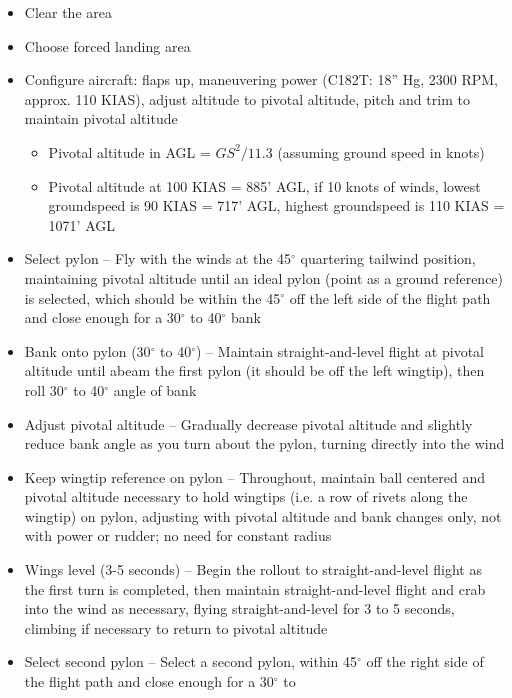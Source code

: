 \begin{itemize}
  \item Clear the area
  \item Choose forced landing area
  \item Configure aircraft: flaps up, maneuvering power (C182T: 18'' Hg, 2300
    RPM, approx. 110 KIAS), adjust altitude to pivotal altitude, pitch and trim
    to maintain pivotal altitude
    \begin{itemize}
      \item Pivotal altitude in AGL = $GS^2 / 11.3$ (assuming ground speed in
        knots)
      \item Pivotal altitude at 100 KIAS = 885' AGL, if 10 knots of winds,
        lowest groundspeed is 90 KIAS = 717' AGL, highest groundspeed is 110
        KIAS = 1071' AGL
    \end{itemize}
  \item Select pylon -- Fly with the winds at the 45$^\circ$ quartering
    tailwind position, maintaining pivotal altitude until an ideal pylon (point
    as a ground reference) is selected, which should be within the 45$^\circ$
    off the left side of the flight path and close enough for a 30$^\circ$ to
    40$^\circ$ bank
  \item Bank onto pylon (30$^\circ$ to 40$^\circ$) -- Maintain
    straight-and-level flight at pivotal altitude until abeam the first pylon
    (it should be off the left wingtip), then roll 30$^\circ$ to 40$^\circ$
    angle of bank
  \item Adjust pivotal altitude -- Gradually decrease pivotal altitude and
    slightly reduce bank angle as you turn about the pylon, turning directly
    into the wind
  \item Keep wingtip reference on pylon -- Throughout, maintain ball centered
    and pivotal altitude necessary to hold wingtips (i.e. a row of rivets along
    the wingtip) on pylon, adjusting with pivotal altitude and bank changes
    only, not with power or rudder; no need for constant radius
  \item Wings level (3-5 seconds) -- Begin the rollout to straight-and-level
    flight as the first turn is completed, then maintain straight-and-level
    flight and crab into the wind as necessary, flying straight-and-level for 3
    to 5 seconds, climbing if necessary to return to pivotal altitude
  \item Select second pylon -- Select a second pylon, within 45$^\circ$ off the
    right side of the flight path and close enough for a 30$^\circ$ to

\end{itemize}
